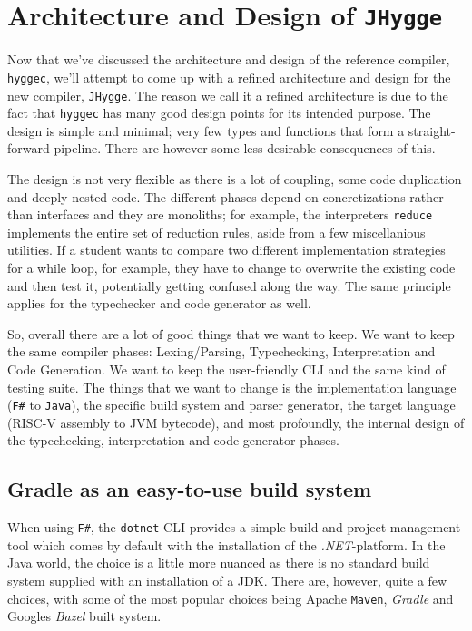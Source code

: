 \section{Architecture and Design of \texttt{JHygge}}

Now that we've discussed the architecture and design of the reference compiler, \texttt{hyggec}, we'll attempt to come up with
a refined architecture and design for the new compiler, \texttt{JHygge}. The reason we call it a refined architecture is due to
the fact that \texttt{hyggec} has many good design points for its intended purpose. The design is simple and minimal; very
few types and functions that form a straight-forward pipeline. There are however some less desirable consequences of this.

The design is not very flexible as there is a lot of coupling, some code duplication and deeply nested code. The different
phases depend on concretizations rather than interfaces and they are monoliths; for example, the interpreters \texttt{reduce}
implements the entire set of reduction rules, aside from a few miscellanious utilities. If a student wants to compare two different
implementation strategies for a while loop, for example, they have to change to overwrite the existing code and then test it,
potentially getting confused along the way. The same principle applies for the typechecker and code generator as well.

So, overall there are a lot of good things that we want to keep. We want to keep the same compiler phases: Lexing/Parsing, Typechecking,
Interpretation and Code Generation. We want to keep the user-friendly CLI and the same kind of testing suite. The things that we
want to change is the implementation language (\texttt{F\#} to \texttt{Java}), the specific build system and parser generator,
the target language (RISC-V assembly to JVM bytecode), and most profoundly, the internal design of the typechecking, interpretation
and code generator phases.

\subsection{Gradle as an easy-to-use build system}

When using \texttt{F\#}, the \texttt{dotnet} CLI provides a simple build and project management tool which comes by default
with the installation of the \textit{.NET}-platform. In the Java world, the choice is a little more nuanced as there is
no standard build system supplied with an installation of a JDK. There are, however, quite a few choices, with some of the
most popular choices being Apache \texttt{Maven}, \textit{Gradle} and Googles \textit{Bazel} built system.

